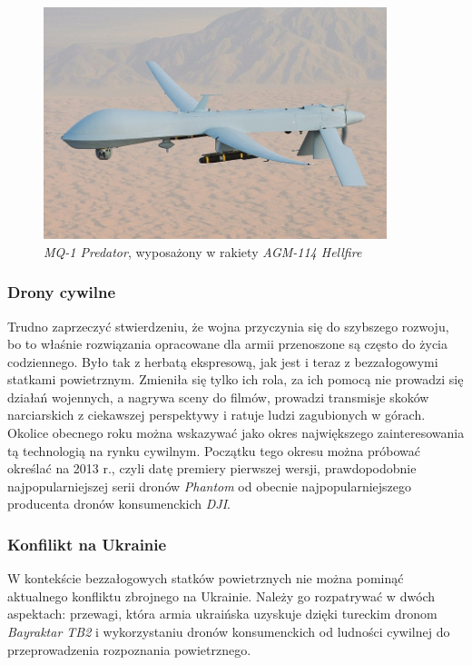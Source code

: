 \begin{figure}[!ht]
\begin{center}
  \includegraphics[width=10cm]{./Obrazy/predator.jpg}
  \caption{\textit{MQ-1 Predator}, wyposażony w rakiety \textit{AGM-114 Hellfire}}
\end{center}
\end{figure}

\subsubsection{Drony cywilne}
Trudno zaprzeczyć stwierdzeniu, że wojna przyczynia się do szybszego rozwoju, bo to właśnie rozwiązania opracowane dla armii przenoszone są często do życia codziennego. Było tak z herbatą ekspresową, jak jest i teraz z bezzałogowymi statkami powietrznym. Zmieniła się tylko ich rola, za ich pomocą nie prowadzi się działań wojennych, a nagrywa sceny do filmów, prowadzi transmisje skoków narciarskich z ciekawszej perspektywy i ratuje ludzi zagubionych w górach. Okolice obecnego roku można wskazywać jako okres największego zainteresowania tą technologią na rynku cywilnym. Początku tego okresu można próbować określać na 2013 r., czyli datę premiery pierwszej wersji, prawdopodobnie najpopularniejszej serii dronów \textit{Phantom} od obecnie najpopularniejszego producenta dronów konsumenckich \textit{DJI}.

\subsubsection{Konfilikt na Ukrainie}
W kontekście bezzałogowych statków powietrznych nie można pominąć aktualnego konfliktu zbrojnego na Ukrainie. Należy go rozpatrywać w dwóch aspektach: przewagi, która armia ukraińska uzyskuje dzięki tureckim dronom \textit{Bayraktar TB2} i wykorzystaniu dronów konsumenckich od ludności cywilnej do przeprowadzenia rozpoznania powietrznego.

